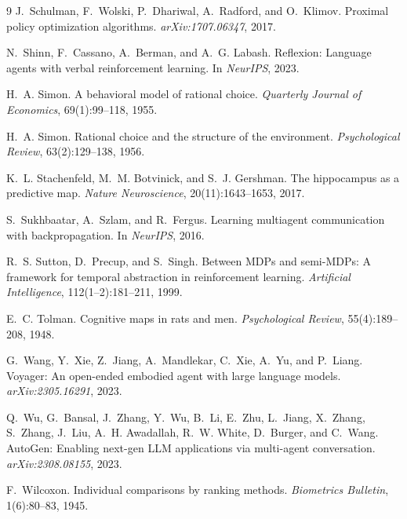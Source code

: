 \documentclass{article}
\begin{document}
{\begin{thebibliography}{9}
J.~Schulman, F.~Wolski, P.~Dhariwal, A.~Radford, and O.~Klimov.
\newblock Proximal policy optimization algorithms.
\newblock \emph{arXiv:1707.06347}, 2017.

N.~Shinn, F.~Cassano, A.~Berman, and A.~G. Labash.
\newblock Reflexion: Language agents with verbal reinforcement learning.
\newblock In \emph{NeurIPS}, 2023.

H.~A. Simon.
\newblock A behavioral model of rational choice.
\newblock \emph{Quarterly Journal of Economics}, 69(1):99--118, 1955.

H.~A. Simon.
\newblock Rational choice and the structure of the environment.
\newblock \emph{Psychological Review}, 63(2):129--138, 1956.

K.~L. Stachenfeld, M.~M. Botvinick, and S.~J. Gershman.
\newblock The hippocampus as a predictive map.
\newblock \emph{Nature Neuroscience}, 20(11):1643--1653, 2017.

S.~Sukhbaatar, A.~Szlam, and R.~Fergus.
\newblock Learning multiagent communication with backpropagation.
\newblock In \emph{NeurIPS}, 2016.

R.~S. Sutton, D.~Precup, and S.~Singh.
\newblock Between MDPs and semi-MDPs: A framework for temporal abstraction in reinforcement learning.
\newblock \emph{Artificial Intelligence}, 112(1--2):181--211, 1999.

E.~C. Tolman.
\newblock Cognitive maps in rats and men.
\newblock \emph{Psychological Review}, 55(4):189--208, 1948.

G.~Wang, Y.~Xie, Z.~Jiang, A.~Mandlekar, C.~Xie, A.~Yu, and P.~Liang.
\newblock Voyager: An open-ended embodied agent with large language models.
\newblock \emph{arXiv:2305.16291}, 2023.

Q.~Wu, G.~Bansal, J.~Zhang, Y.~Wu, B.~Li, E.~Zhu, L.~Jiang, X.~Zhang, S.~Zhang, J.~Liu, A.~H. Awadallah, R.~W. White, D.~Burger, and C.~Wang.
\newblock AutoGen: Enabling next-gen LLM applications via multi-agent conversation.
\newblock \emph{arXiv:2308.08155}, 2023.

F.~Wilcoxon.
\newblock Individual comparisons by ranking methods.
\newblock \emph{Biometrics Bulletin}, 1(6):80--83, 1945.


\end{thebibliography}}
\end{document}
